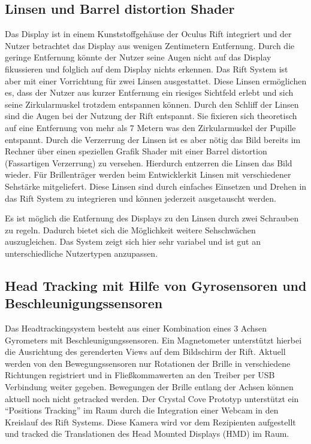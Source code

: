 \documentclass[pagesize, paper=a4, fontsize=12pt,titlepage=true, headings=small, headnosepline, abstractoff, liststotoc, nochapterprefix, plainheadsepline, twoside]{scrreprt}
\begin{document}
\subsection{Linsen und Barrel distortion Shader}
Das Display ist in einem Kunststoffgehäuse der Oculus Rift integriert und der Nutzer betrachtet das Display aus wenigen Zentimetern Entfernung. Durch die geringe Entfernung könnte der Nutzer seine Augen nicht auf das Display fikussieren und folglich auf dem Display nichts erkennen. Das Rift System ist aber mit einer Vorrichtung für zwei Linsen ausgestattet. Diese Linsen ermöglichen es, dass der Nutzer aus kurzer Entfernung ein riesiges Sichtfeld erlebt und sich seine Zirkularmuskel trotzdem entspannen können. Durch den Schliff der Linsen sind die Augen bei der Nutzung der Rift entspannt. Sie fixieren sich theoretisch auf eine Entfernung von mehr als 7 Metern was den Zirkularmuskel der Pupille entspannt. Durch die Verzerrung der Linsen ist es aber nötig das Bild bereits im Rechner über einen speziellen Grafik Shader mit einer Barrel distortion (Fassartigen Verzerrung) zu versehen. Hierdurch entzerren die Linsen das Bild wieder. Für Brillenträger werden beim Entwicklerkit Linsen mit verschiedener Sehstärke mitgeliefert. Diese Linsen sind durch einfaches Einsetzen und Drehen in das Rift System zu integrieren und können jederzeit ausgetauscht werden.

Es ist möglich die Entfernung des Displays zu den Linsen durch zwei Schrauben zu regeln. Dadurch bietet sich die Möglichkeit weitere Sehschwächen auszugleichen. Das System zeigt sich hier sehr variabel und ist gut an unterschiedliche Nutzertypen anzupassen.

\subsection{Head Tracking mit Hilfe von Gyrosensoren  und Beschleunigungssensoren}
Das Headtrackingsystem besteht aus einer Kombination eines 3 Achsen Gyrometers mit Beschleunigungssensoren. Ein Magnetometer unterstützt hierbei die Ausrichtung des gerenderten Views auf dem Bildschirm der Rift. Aktuell werden von den Bewegungssensoren nur Rotationen der Brille in verschiedene Richtungen registriert und in Fließkommawerten an den Treiber per USB Verbindung weiter gegeben. Bewegungen der Brille entlang der Achsen können aktuell noch nicht getracked werden. Der Crystal Cove Prototyp unterstützt ein "`Positions Tracking"' im Raum durch die Integration einer Webcam in den Kreislauf des Rift Systems. Diese Kamera wird vor dem Rezipienten aufgestellt und tracked die Translationen des Head Mounted Displays (HMD) im Raum.
\\
\end{document}
